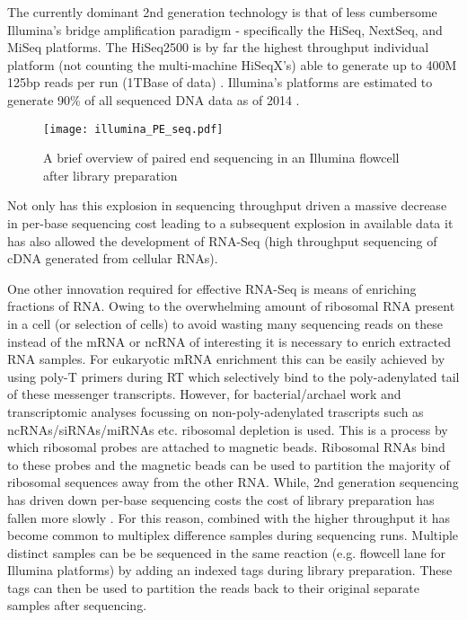 The currently dominant 2nd generation technology is that of less cumbersome \citep{Shendure2008} Illumina's bridge amplification
paradigm - specifically the HiSeq, NextSeq, and MiSeq platforms.  
The HiSeq2500 is by far the highest throughput individual platform (not counting the multi-machine HiSeqX's) able to generate up to 
400M 125bp reads per run (1TBase of data) \citep{Nederbragt2013}.
Illumina's platforms are estimated to generate 90\% of all sequenced DNA data as of 2014 \citep{Regalado2014}.

\begin{figure}
    \texttt{[image: illumina\_PE\_seq.pdf]}
    \label{fig:libprep}
    \caption{A brief overview of paired end sequencing in an Illumina flowcell after library preparation}
\end{figure}


Not only has this explosion in sequencing throughput driven a massive decrease in per-base sequencing cost
leading to a subsequent explosion in available data it has also allowed the development of 
RNA-Seq (high throughput sequencing of cDNA generated from cellular RNAs).

One other innovation required for effective RNA-Seq is means of enriching fractions of RNA.
Owing to the overwhelming amount of ribosomal RNA present in a cell (or selection of cells) to avoid
wasting many sequencing reads on these instead of the mRNA or ncRNA of interesting it is necessary
to enrich extracted RNA samples.  For eukaryotic mRNA enrichment this can be easily achieved by
using poly-T primers during RT which selectively bind to the poly-adenylated tail of these messenger 
transcripts.  However, for bacterial/archael work and transcriptomic analyses focussing on non-poly-adenylated
trascripts such as ncRNAs/siRNAs/miRNAs etc. ribosomal depletion is used.  This is a process by which 
ribosomal probes are attached to magnetic beads. Ribosomal RNAs bind to these probes and the magnetic
beads can be used to partition the majority of ribosomal sequences away from the other RNA.
While, 2nd generation sequencing has driven down per-base sequencing costs the cost of library preparation 
has fallen more slowly \citep{Blainey2013}.
For this reason, combined with the higher throughput it has become common to multiplex difference samples 
during sequencing runs.  Multiple distinct samples can be be sequenced
in the same reaction (e.g. flowcell lane for Illumina platforms) by adding an indexed tags during library
preparation.  These tags can then be used to partition the reads back to their original separate samples
after sequencing. 


